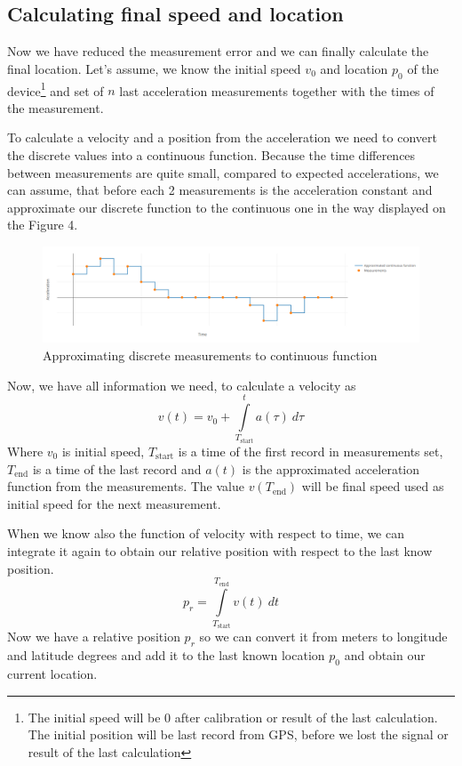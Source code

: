 \documentclass[hidelinks,a4paper]{article}
\begin{document}
\subsection{Calculating final speed and location}
Now we have reduced the measurement error and we can finally calculate the final location. Let's assume, we know the initial speed $v_0$ and location $p_0$ of the device\footnote{The initial speed will be 0 after calibration or result of the last calculation. The initial position will be last record from GPS, before we lost the signal or result of the last calculation} and set of $n$ last acceleration measurements together with the times of the measurement.\par
To calculate a velocity and a position from the acceleration we need to convert the discrete values into a continuous function. Because the time differences between measurements are quite small, compared to expected accelerations, we can assume, that before each 2 measurements is the acceleration constant and approximate our discrete function to the continuous one in the way displayed on the Figure 4.\par
\begin{figure}[h]
    \includegraphics[width=15cm]{img/DiscToCont.png}
    \caption{Approximating discrete measurements to continuous function}
\end{figure}
Now, we have all information we need, to calculate a velocity as
$$
    v(t) = v_0 + \int\limits_{T_\text{start}}^{t} a(\tau)~d\tau
$$
Where $v_0$ is initial speed, $T_\text{start}$ is a time of the first record in measurements set, $T_\text{end}$ is a time of the last record and $a(t)$ is the approximated acceleration function from the measurements. The value $v(T_\text{end})$ will be final speed used as initial speed for the next measurement.\par
When we know also the function of velocity with respect to time, we can integrate it again to obtain our relative position with respect to the last know position.
$$
    p_r = \int\limits_{T_\text{start}}^{T_\text{end}} v(t)~dt
$$
Now we have a relative position $p_r$ so we can convert it from meters to longitude and latitude degrees and add it to the last known location $p_0$ and obtain our current location.\par
\end{document}
